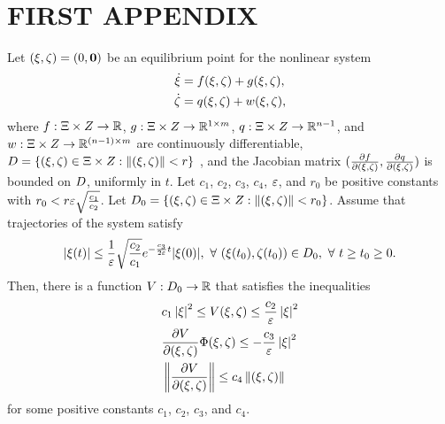 %
%
%



\chapter{\uppercase{First Appendix}}

\begin{theorem}
  Let $(\xi, \zeta) = (0, {\mathbf 0})$ be an equilibrium point for the nonlinear system
  \begin{align*}
    {\dot {\xi}} &= f(\xi, \zeta) + g(\xi, \zeta),\\
    {\dot {\zeta}} &= q(\xi, \zeta) + w(\xi, \zeta),
  \end{align*}
  where $f : \Xi \times Z \to \mathbb{R}$,  $g : \Xi \times Z \to
  \mathbb{R}^{1 \times m}$, $q : \Xi \times Z \to \mathbb{R}^{n-1}$,  and $w : \Xi \times
  Z \to \mathbb{R}^{(n-1) \times m}$ are continuously differentiable, $D = \{(\xi, \zeta)
  \in \Xi \times Z : \left\|(\xi, \zeta)\right\| < r \}$ , and the Jacobian matrix
  $(\frac{\partial{f}}{\partial{(\xi, \zeta)}}, \frac{\partial{q}}{\partial{(\xi, \zeta)}})$\xspace is bounded on $D$, uniformly in
  $t$. Let $c_{1}$, $c_{2}$, $c_{3}$, $c_{4}$, $\varepsilon$, and $r_{0}$ be
  positive constants with $r_{0} < r \varepsilon
  \sqrt{\frac{c_{1}}{c_{2}}}$. Let $D_{0} = \{ (\xi, \zeta) \in \Xi \times Z :
  \left\|(\xi, \zeta)\right\| < r_{0} \}$. Assume that trajectories of the system satisfy
  \begin{align*}
    |\xi(t)| \leq \frac{1}{\varepsilon} \sqrt{\frac{c_{2}}{c_{1}}}
    e^{-\frac{c_{3}}{2 \varepsilon} t} |\xi(0)|, \ \forall \
    (\xi(t_{0}), \zeta(t_{0})) \in D_{0}, \ \forall \ t \geq t_{0} \geq 0.
  \end{align*}
  Then, there is a function $V : D_{0} \to \mathbb{R}$ that satisfies the inequalities
  \begin{eqnarray*}
    & c_{1} \left|\xi\right|^{2} \leq V(\xi, \zeta) \leq \frac{c_{2}}{\varepsilon} \left|\xi\right|^{2}\\
    & \frac{\partial{V}}{\partial{(\xi, \zeta)}} \Phi(\xi, \zeta) \leq -\frac{c_{3}}{\varepsilon} \left|\xi\right|^{2}\\
    & \left\| \frac{\partial{V}}{\partial{(\xi, \zeta)}} \right\| \leq c_{4} \left\|(\xi, \zeta)\right\|
  \end{eqnarray*}
  for some positive constants $c_{1}$, $c_{2}$, $c_{3}$, and $c_{4}$.
\end{theorem}

